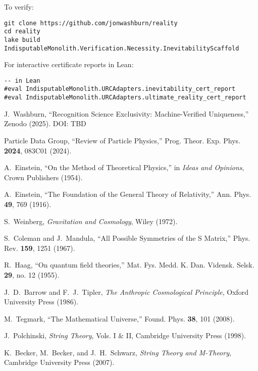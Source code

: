 \documentclass[12pt]{article}
\theoremstyle{remark}
\begin{document}
\begin{appendix}
\noindent To verify:
\begin{verbatim}
git clone https://github.com/jonwashburn/reality
cd reality
lake build IndisputableMonolith.Verification.Necessity.InevitabilityScaffold
\end{verbatim}

For interactive certificate reports in Lean:
\begin{verbatim}
-- in Lean
#eval IndisputableMonolith.URCAdapters.inevitability_cert_report
#eval IndisputableMonolith.URCAdapters.ultimate_reality_cert_report
\end{verbatim}

\end{appendix}

\begin{thebibliography}{99}

J.~Washburn,
``Recognition Science Exclusivity: Machine-Verified Uniqueness,''
Zenodo (2025). DOI: TBD

Particle Data Group,
``Review of Particle Physics,''
Prog. Theor. Exp. Phys. \textbf{2024}, 083C01 (2024).

A.~Einstein,
``On the Method of Theoretical Physics,'' in \emph{Ideas and Opinions},
Crown Publishers (1954).

A.~Einstein,
``The Foundation of the General Theory of Relativity,''
Ann. Phys. \textbf{49}, 769 (1916).

S.~Weinberg,
\emph{Gravitation and Cosmology},
Wiley (1972).

S.~Coleman and J.~Mandula,
``All Possible Symmetries of the S Matrix,''
Phys. Rev. \textbf{159}, 1251 (1967).

R.~Haag,
``On quantum field theories,''
Mat. Fys. Medd. K. Dan. Vidensk. Selsk. \textbf{29}, no. 12 (1955).

J.~D.~Barrow and F.~J.~Tipler,
\emph{The Anthropic Cosmological Principle},
Oxford University Press (1986).

M.~Tegmark,
``The Mathematical Universe,''
Found. Phys. \textbf{38}, 101 (2008).

J.~Polchinski,
\emph{String Theory}, Vols. I \& II,
Cambridge University Press (1998).

K.~Becker, M.~Becker, and J.~H.~Schwarz,
\emph{String Theory and M-Theory},
Cambridge University Press (2007).


\end{thebibliography}
\end{document}
